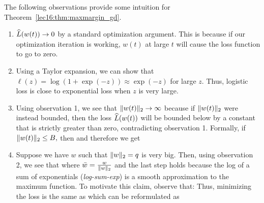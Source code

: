 The following observations provide some intuition for Theorem~\ref{lec16:thm:maxmargin_gd}.
\begin{enumerate}
    \item \(\widehat{L}(w(t)) \to 0\) by a standard optimization argument. This is because if our optimization iteration is working, \(w(t)\) at large \(t\) will cause the loss function to go to zero.
    \item Using a Taylor expansion, we can show that \( \ell(z) = \log(1 + \exp(-z)) \approx \exp(-z)\) for large \(z\). Thus, logistic loss is close to exponential loss when \(z\) is very large.
    \item Using observation 1, we see that \(\|w(t)\|_{2} \to \infty\) because if \(\|w(t)\|_{2}\) were instead bounded, then the loss \(\widehat{L} (w(t))\) will be bounded below by a constant that is strictly greater than zero, contradicting observation 1. Formally, if
    \(\|w(t)\|_{2} \leq B,\)
    then
    and therefore we get
    \item Suppose we have \(w\) such that \(\|w\|_{2} = q \) is very big. Then, using observation 2, we see that
    where \( \bar{w} = \frac{w}{\|w\|_{2}}\) and the last step holds because the log of a sum of exponentials (\textit{log-sum-exp}) is a smooth approximation to the maximum function. To motivate this claim, observe that:  
    Thus, minimizing the loss is the same as
    which can be reformulated as

\end{enumerate}

